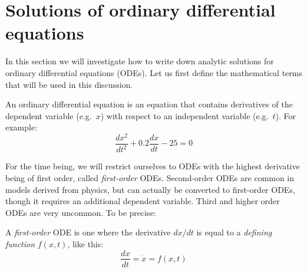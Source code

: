 \documentclass[
  letterpaper,
  DIV=11,
  numbers=noendperiod]{scrreprt}
\begin{document}
\hypertarget{solutions-of-ordinary-differential-equations-1}{%
\section{Solutions of ordinary differential
equations}\label{solutions-of-ordinary-differential-equations-1}}

\label{sec:math15}

In this section we will investigate how to write down analytic solutions
for ordinary differential equations (ODEs). Let us first define the
mathematical terms that will be used in this discussion.

\begin{tcolorbox}[enhanced jigsaw, arc=.35mm, colframe=quarto-callout-note-color-frame, left=2mm, opacitybacktitle=0.6, breakable, title=\textcolor{quarto-callout-note-color}{\faInfo}\hspace{0.5em}{Definition}, toprule=.15mm, coltitle=black, bottomtitle=1mm, toptitle=1mm, colback=white, leftrule=.75mm, colbacktitle=quarto-callout-note-color!10!white, titlerule=0mm, opacityback=0, rightrule=.15mm, bottomrule=.15mm]

An ordinary differential equation is an equation that contains
derivatives of the  dependent variable
(e.g.~\(x\)) with respect to an independent variable (e.g.~\(t\)). For
example: \[ \frac{dx^2}{dt^2}+ 0.2 \frac{dx}{dt} - 25 = 0 \]

\end{tcolorbox}

For the time being, we will restrict ourselves to ODEs with the highest
derivative being of first order, called \emph{first-order} ODEs.
Second-order ODEs are common in models derived from physics, but can
actually be converted to first-order ODEs, though it requires an
additional dependent variable. Third and higher order ODEs are very
uncommon. To be precise:

\begin{tcolorbox}[enhanced jigsaw, arc=.35mm, colframe=quarto-callout-note-color-frame, left=2mm, opacitybacktitle=0.6, breakable, title=\textcolor{quarto-callout-note-color}{\faInfo}\hspace{0.5em}{Definition}, toprule=.15mm, coltitle=black, bottomtitle=1mm, toptitle=1mm, colback=white, leftrule=.75mm, colbacktitle=quarto-callout-note-color!10!white, titlerule=0mm, opacityback=0, rightrule=.15mm, bottomrule=.15mm]

A \emph{first-order} ODE is one where the derivative \(dx/dt\) is equal
to a \emph{defining function} \(f(x,t)\), like this:
\[\frac{dx} {dt} = \dot x = f(x,t)\]

\end{tcolorbox}
\end{document}
